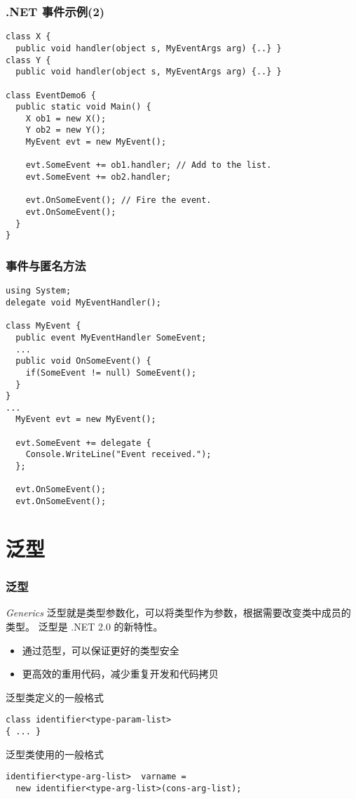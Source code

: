 \begin{frame}[fragile]
\frametitle{.NET 事件示例(2)}
\begin{lstlisting}
class X {
  public void handler(object s, MyEventArgs arg) {..} }
class Y {
  public void handler(object s, MyEventArgs arg) {..} }

class EventDemo6 {
  public static void Main() {
    X ob1 = new X();
    Y ob2 = new Y();
    MyEvent evt = new MyEvent();

    evt.SomeEvent += ob1.handler; // Add to the list.
    evt.SomeEvent += ob2.handler;

    evt.OnSomeEvent(); // Fire the event.
    evt.OnSomeEvent();
  }
}
\end{lstlisting}
\end{frame}

\begin{frame}[fragile]
\frametitle{事件与匿名方法}
\begin{lstlisting}
using System;
delegate void MyEventHandler();

class MyEvent {
  public event MyEventHandler SomeEvent;
  ...
  public void OnSomeEvent() {
    if(SomeEvent != null) SomeEvent();
  }
}
...
  MyEvent evt = new MyEvent();

  evt.SomeEvent += delegate {
    Console.WriteLine("Event received.");
  };

  evt.OnSomeEvent();
  evt.OnSomeEvent();

\end{lstlisting}

\end{frame}

\section{泛型}

\begin{frame}[fragile]
\frametitle{泛型}
\begin{block}{\textit{Generics}}
  \CJKindent 泛型就是类型参数化，可以将类型作为参数，根据需要改变类中成员的类型。
  泛型是 .NET 2.0 的新特性。
\end{block}

\begin{itemize}
\item 通过范型，可以保证更好的类型安全
\item 更高效的重用代码，减少重复开发和代码拷贝
\end{itemize}
\pause
泛型类定义的一般格式
\begin{lstlisting}
class identifier<type-param-list>
{ ... }
\end{lstlisting}
泛型类使用的一般格式
\begin{lstlisting}
identifier<type-arg-list>  varname =
  new identifier<type-arg-list>(cons-arg-list);
\end{lstlisting}
\end{frame}


